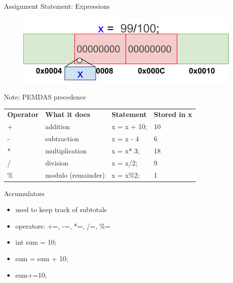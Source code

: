 \documentclass[xcolor={dvipsnames}]{beamer}
\begin{document}
\begin{frame}{Assignment Statement: Expressions}
\begin{figure}
	\includegraphics[width=1\textwidth]{expr}
\end{figure}

\begin{block}{Note: PEMDAS precedence}
	\begin{tabularx}{\textwidth}{X X X X}
		\textbf{Operator} & \textbf{What it does} & \textbf{Statement} & \textbf{Stored in x}\\
		+ & addition & x = x + 10; & 10 \\
		- & subtraction & x = x - 4 & 6 \\
		*& multiplication & x = x* 3; &  18 \\
		/ & division & x = x/2; & 9 \\
		\% & modulo (remainder) &  x = x\%2; & 1 \\  
	\end{tabularx}
\end{block}
\end{frame}

\begin{frame}{Accumulators}
	\begin{block}{}
		\begin{itemize}
		\item used to keep track of subtotals
		\item operators: +=, -=, *=, /=, \%=
		\end{itemize}
	\end{block}
	
	\begin{block}{}
		\begin{itemize}
			\item int sum = 10;
			\item sum = sum + 10;
			\item sum+=10;
		\end{itemize}
	\end{block}
\end{frame}
\end{document}
